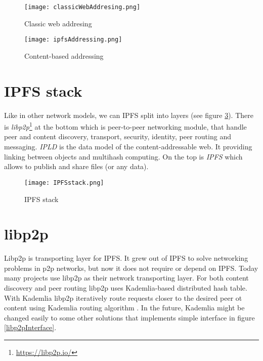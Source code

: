 \begin{figure}[h]
    \centering
    \texttt{[image: classicWebAddresing.png]}
    \caption{Classic web addresing}
    \label{webAddressing}
\end{figure}

\begin{figure}[h]
    \centering
    \texttt{[image: ipfsAddressing.png]}
    \caption{Content-based addressing}
    \label{ipfsAddressing}
\end{figure}

\section{IPFS stack}
Like in other network models, we can IPFS split into layers (see figure \ref{IPFSstack}). There is \textit{libp2p}\footnote{\url{https://libp2p.io/}} at the bottom which is peer-to-peer networking module, that handle peer and content discovery, transport, security, identity, peer routing and messaging. \textit{IPLD} is the data model of the content-addressable web. It providing linking between objects and multihash computing. On the top is \textit{IPFS} which allows to publish and share files (or any data).\cite{IPFSwhitepaper}


\begin{figure}[h]
    \centering
    \texttt{[image: IPFSstack.png]}
    \caption{IPFS stack}
    \label{IPFSstack}
\end{figure}


\section{libp2p}
Libp2p is transporting layer for IPFS. It grew out of IPFS to solve networking problems in p2p networks, but now it does not require or depend on IPFS. Today many projects use libp2p as their network transporting layer. For both content discovery and peer routing libp2p uses Kademlia-based distributed hash table. With Kademlia libp2p iteratively route requests closer to the desired peer ot content using Kademlia routing algorithm \cite{kademlia}. In the future, Kademlia might be changed easily to some other solutions that implements simple interface in figure \ref{libp2pInterface}.


